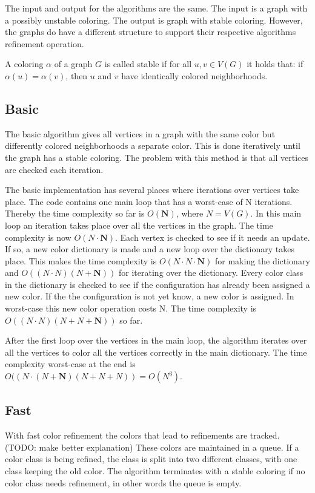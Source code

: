 \documentclass[twoside]{article}
\begin{document}
\begin{multicols}{2}
The input and output for the algorithms are the same. The input is a graph with a possibly unstable  coloring. The output is graph with stable coloring. However, the graphs do have a different structure to support their respective algorithms refinement operation. 

A coloring $\alpha$ of a graph $G$ is called stable if for all $u, v \in V(G)$ it holds that: if $\alpha(u) = \alpha(v)$, then $u$ and $v$ have identically colored neighborhoods.
 

\subsection{Basic}
The basic algorithm gives all vertices in a graph with the same color but differently colored neighborhoods a separate color. This is done iteratively until the graph has a stable coloring. The problem with this method is that all vertices are checked each iteration. 

The basic implementation has several places where iterations over vertices take place. The code contains one main loop that has a worst-case of N iterations. Thereby the time complexity so far is $O(\boldsymbol{N})$, where $N = V(G)$. In this main loop an iteration takes place over all the vertices in the graph. The time complexity is now $O(N \cdot \boldsymbol{N})$. Each vertex is checked to see if it needs an update. If so, a new color dictionary is made and a new loop over the dictionary takes place. This makes the time complexity is $O(N \cdot N \cdot \boldsymbol{N})$ for making the dictionary and $O((N \cdot N)(N+\boldsymbol{N}))$ for iterating over the dictionary. Every color class in the dictionary is checked to see if the configuration has already been assigned a new color. If the the configuration is not yet know, a new color is assigned. In worst-case this new color operation costs N. The time complexity is $O((N \cdot N)(N+N+\boldsymbol{N}))$ so far.

After the first loop over the vertices in the main loop, the algorithm iterates over all the vertices to color all the vertices correctly in the main dictionary. The time complexity worst-case at the end is $O((N \cdot (N+\boldsymbol{N})(N+N+N)) = O(N^3)$.

\subsection{Fast}
With fast color refinement the colors that lead to refinements are tracked.(TODO: make better explanation) These colors are maintained in a queue. If a color class is being refined, the class is split into two different classes, with one class keeping the old color. The algorithm terminates with a stable coloring if no color class needs refinement, in other words the queue is empty. 


\end{multicols}
\end{document}
